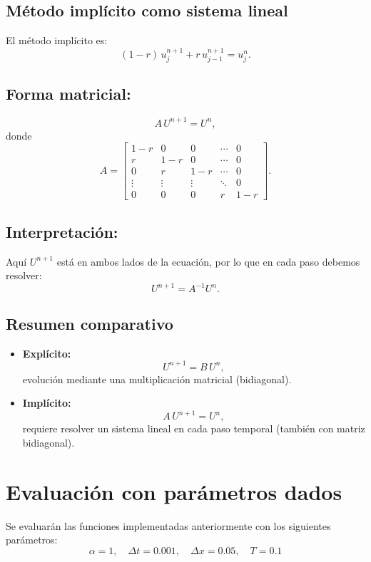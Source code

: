 \documentclass[12pt,a4paper]{article}
\begin{document}
\subsection{Método implícito como sistema lineal}

El método implícito es:
\[
(1-r)\,u_j^{n+1} + r\,u_{j-1}^{n+1} = u_j^n.
\]

\subsection*{Forma matricial:}
\[
A\,U^{n+1} = U^n,
\]
donde
\[
A = 
\begin{bmatrix}
1-r & 0   & 0   & \cdots & 0 \\[4pt]
r   & 1-r & 0   & \cdots & 0 \\[4pt]
0   & r   & 1-r & \cdots & 0 \\[4pt]
\vdots & \vdots & \vdots & \ddots & 0 \\[4pt]
0   & 0   & 0   & r      & 1-r
\end{bmatrix}.
\]

\subsection*{Interpretación:}
Aquí $U^{n+1}$ está en ambos lados de la ecuación, por lo que en cada paso debemos resolver:
\[
U^{n+1} = A^{-1} U^n.
\]

\subsection{Resumen comparativo}

\begin{itemize}
    \item \textbf{Explícito:}  
    \[
    U^{n+1} = B\,U^n,
    \]
    evolución mediante una multiplicación matricial (bidiagonal).

    \item \textbf{Implícito:}  
    \[
    A\,U^{n+1} = U^n,
    \]
    requiere resolver un sistema lineal en cada paso temporal (también con matriz bidiagonal).
\end{itemize}

\section{Evaluación con parámetros dados}

Se evaluarán las funciones implementadas anteriormente con los siguientes parámetros:
\[
\alpha = 1, \quad \Delta t = 0.001, \quad \Delta x = 0.05, \quad T = 0.1
\]
\end{document}
